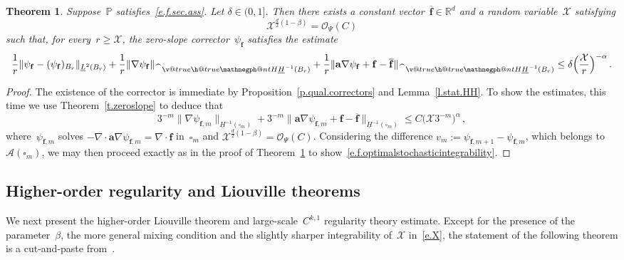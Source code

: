 \documentclass[11pt]{article} %
\makeatletter
\let\oldsquare\square %
\renewcommand{\square}{\oldsquare}
\numberwithin{equation}{section}
\newtheorem{theorem}{Theorem}[section]
\theoremstyle{definition}
\newcommand*{\Rd}{\ensuremath{\mathbb{R}^d}}
\renewcommand*{\hat}{\widehat}
\newcommand{\f}{\mathbf{f}}
\renewcommand{\a}{\mathbf{a}}
\newcommand{\cu}{\square}
\renewcommand{\P}{\mathbb{P}}
\newcommand{\X}{\mathcal{X}}
\renewcommand{\O}{\mathcal{O}}
\newcommand{\negphantom}{\v@true\h@true\negph@nt}
\newcommand{\negph@nt}{\ifmmode\expandafter\mathpalette 
  \expandafter\mathnegph@nt\else\expandafter\makenegph@nt\fi}
\newcommand{\makenegph@nt}[1]{%
  \setbox\z@\hbox{\color@begingroup#1\color@endgroup}\finnegph@nt}
\newcommand{\finnegph@nt}{%
  \setbox\tw@\null 
  \ifv@ \ht\tw@\ht\z@\dp\tw@\dp\z@\fi \ifh@\wd\tw@-\wd\z@\fi\box\tw@}
\newcommand{\mathnegph@nt}[2]{%
  \setbox\z@\hbox{$\m@th #1{#2}$}\finnegph@nt}
\newcommand{\Hminusul}{\hat{\phantom{H}}\negphantom{H}\underline{H}^{-1}}
\newcommand{\A}{\mathcal{A}}
\makeatother
\begin{document}
\begin{theorem}
\label{t.f.optimalstochasticintegrability}
Suppose~$\P$ satisfies~\eqref{e.f.sec.ass}. Let $\delta \in (0,1]$. 
Then there exists a constant vector~$\overline{\f}\in
\Rd$  and a random variable~$\X$ satisfying   
\begin{equation} \label{e.f.X.integrability}
\X^{\frac d2(1-\beta)} = \O_\Psi(C)
\end{equation}
such that, for every~$r \geq \X$, the zero-slope corrector~$\psi_\f$ satisfies the estimate
\begin{equation}  \label{e.f.optimalstochasticintegrability}
\frac1r \|\psi_\f - (\psi_\f)_{B_r} \|_{\underline{L}^2(B_r)}
+
\frac1r \|\nabla \psi_\f \|_{\Hminusul(B_r)} +  \frac1r \|\a \nabla \psi_\f + \f - \overline{\f} \|_{\Hminusul(B_r)} 
\leq 
\delta \Bigl(\frac{\X}{r} \Bigr)^{-\alpha}\,.
\end{equation}
\end{theorem}
\begin{proof}
The existence of the corrector is immediate by Proposition~\ref{p.qual.correctors} and Lemma~\ref{l.stat.HH}. To show the estimates, this time we use Theorem~\ref{t.zeroslope} to deduce that 
\begin{equation*}  
3^{-m}\bigl\| \nabla \psi_{\f,m} \bigr\|_{\underline{H}^{-1}(\cu_m)} 
+
3^{-m} \bigl\| \a \nabla \psi_{\f,m} + \f - \overline{\f} \bigr\|_{\underline{H}^{-1}(\cu_m)} 
\leq 
C  \bigl( \X 3^{-m} \bigr)^{\alpha}
\,,
\end{equation*}
where~$\psi_{\f,m}$ solves $-\nabla \cdot \a \nabla \psi_{\f,m} = \nabla \cdot \f$ in~$\cu_m$ and $\X^{\frac d2(1-\beta)} = \O_\Psi(C)$.  Considering the difference $v_{m} := \psi_{\f,m+1}-\psi_{\f,m}$, which belongs to~$\A(\cu_m)$, we may then proceed exactly as in the proof of Theorem~\ref{t.f.optimalstochasticintegrability} to show~\eqref{e.f.optimalstochasticintegrability}. 
\end{proof}




\subsection{Higher-order regularity and Liouville theorems}
\label{ss.higherorder.reg}

We next present the higher-order Liouville theorem and large-scale~$C^{k,1}$ regularity theory estimate. Except for the presence of the parameter~$\beta$, the more general mixing condition and the slightly sharper integrability of~$\X$ in~\eqref{e.X}, the statement of the following theorem is a cut-and-paste from~\cite[Theorem 3.8]{AKMBook}.
\end{document}
